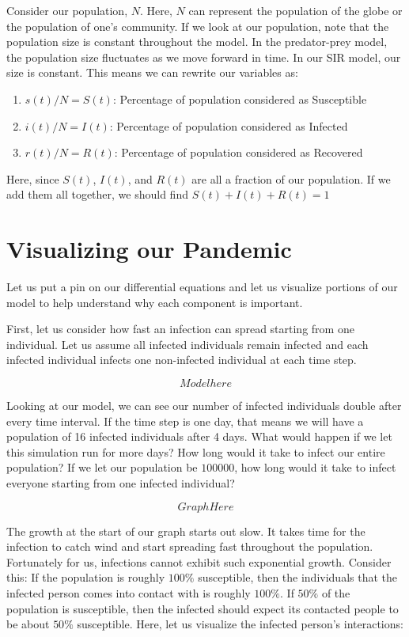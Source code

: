 \documentclass{amsart}
\theoremstyle{definition}
\numberwithin{equation}{section}
\begin{document}
\begin{sansmath}
Consider our population, $N$. Here, $N$ can represent the population of the globe or the population of one's community. If we look at our population, note that the population size is constant throughout the model. In the predator-prey model, the population size fluctuates as we move forward in time. In our SIR model, our size is constant. This means we can rewrite our variables as:
%
\begin{enumerate}
  \item $s(t)/N = S(t)$: Percentage of population considered as Susceptible
  \item $i(t)/N = I(t)$: Percentage of population considered as Infected
  \item $r(t)/N = R(t)$: Percentage of population considered as Recovered
\end{enumerate}

Here, since $S(t)$, $I(t)$, and $R(t)$ are all a fraction of our population. If we add them all together, we should find $S(t) + I(t) + R(t) = 1$

\section{Visualizing our Pandemic}

Let us put a pin on our differential equations and let us visualize portions of our model to help understand why each component is important.

First, let us consider how fast an infection can spread starting from one individual. Let us assume all infected individuals remain infected and each infected individual infects one non-infected individual at each time step.

\[ Model here \]

Looking at our model, we can see our number of infected individuals double after every time interval. If the time step is one day, that means we will have a population of 16 infected individuals after 4 days. What would happen if we let this simulation run for more days? How long would it take to infect our entire population? If we let our population be $100000$, how long would it take to infect everyone starting from one infected individual?

\[ Graph Here \]

The growth at the start of our graph starts out slow. It takes time for the infection to catch wind and start spreading fast throughout the population. Fortunately for us, infections cannot exhibit such exponential growth. Consider this: If the population is roughly $100\%$ susceptible, then the individuals that the infected person comes into contact with is roughly $100\%$. If $50\%$ of the population is susceptible, then the infected should expect its contacted people to be about $50\%$ susceptible. Here, let us visualize the infected person's interactions:


\end{sansmath}
\end{document}
